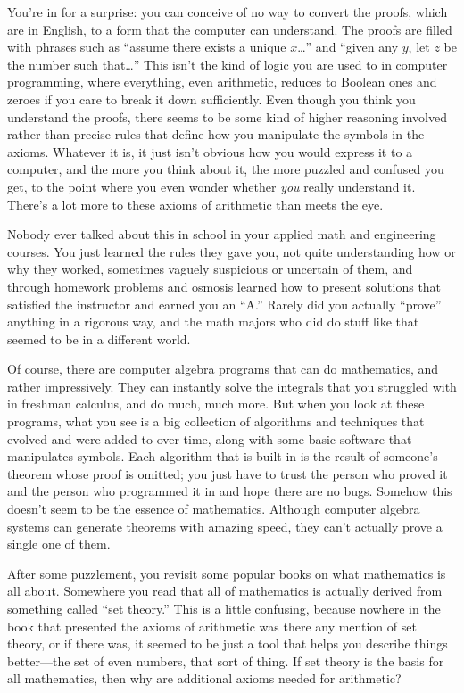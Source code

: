 You're in for a surprise:  you can conceive of no way to convert the
proofs, which are in English, to a form that the computer can understand.
The proofs are filled with phrases such as ``assume there exists a unique
$x$\ldots'' and ``given any $y$, let $z$ be the number such that\ldots''  This
isn't the kind of logic you are used to in computer programming, where
everything, even arithmetic, reduces to Boolean ones and zeroes if you care to
break it down sufficiently.  Even though you think you understand the proofs,
there seems to be some kind of higher reasoning involved rather than precise
rules that define how you manipulate the symbols in the axioms.  Whatever it
is, it just isn't obvious how you would express it to a computer, and the more
you think about it, the more puzzled and confused you get, to the point where
you even wonder whether {\em you} really understand it.  There's a lot more to
these axioms of arithmetic than meets the eye.

Nobody ever talked about this in school in your applied math and engineering
courses.  You just learned the rules they gave you, not quite understanding
how or why they worked, sometimes vaguely suspicious or uncertain of them, and
through homework problems and osmosis learned how to present solutions that
satisfied the instructor and earned you an ``A.''  Rarely did you actually
``prove'' anything in a rigorous way, and the math majors who did do stuff
like that seemed to be in a different world.

Of course, there are computer algebra programs that can do mathematics, and
rather impressively.  They can instantly solve the integrals that you
struggled with in freshman calculus, and do much, much more.  But when you
look at these programs, what you see is a big collection of algorithms and
techniques that evolved and were added to over time, along with some basic
software that manipulates symbols.  Each algorithm that is built in is the
result of someone's theorem whose proof is omitted; you just have to trust the
person who proved it and the person who programmed it in and hope there are no
bugs.  Somehow this doesn't seem to be the
essence of mathematics.  Although computer algebra systems can generate
theorems with amazing speed, they can't actually prove a single one of them.

After some puzzlement, you revisit some popular books on what mathematics is
all about.  Somewhere you read that all of mathematics is actually derived
from something called ``set theory.''  This is a little confusing, because
nowhere in the book that presented the axioms of arithmetic was there any
mention of set theory, or if there was, it seemed to be just a tool that helps
you describe things better---the set of even numbers, that sort of thing.  If
set theory is the basis for all mathematics, then why are additional axioms
needed for arithmetic?

